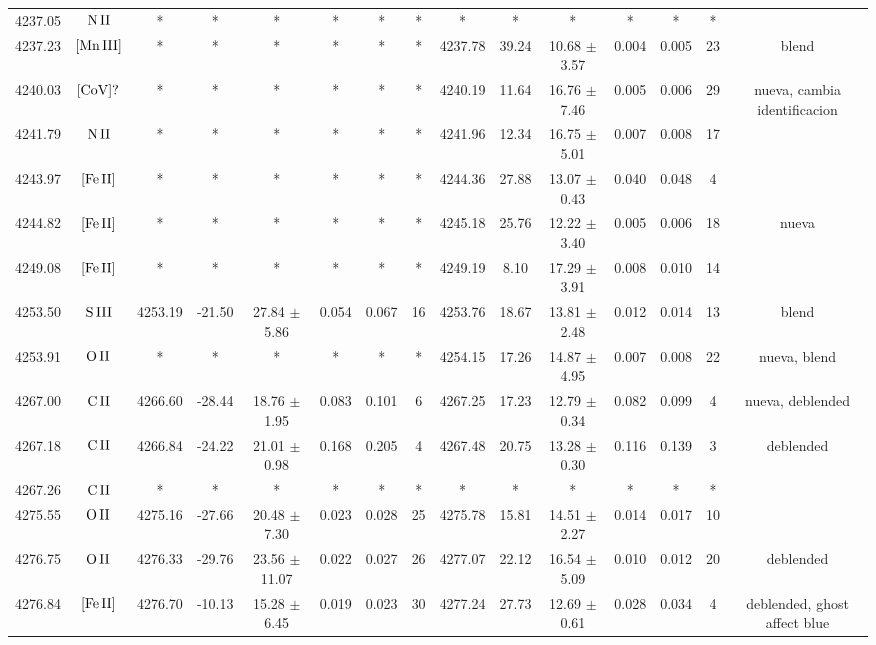 \documentclass{article}
\begin{document}
\begin{table*}
\begin{adjustbox}{width=\textwidth}
\begin{tabular}{ccccccccccccccc}
4237.05 & $\mbox{N}\thinspace \mbox{II}$ & * & * & * & * & * & * & * & * & * & * & * & * &  \\
4237.23 & $\mbox{[Mn}\thinspace \mbox{III]}$ & * & * & * & * & * & * & 4237.78 & 39.24 & 10.68 $\pm$ 3.57 & 0.004 & 0.005 & 23 &  blend \\
4240.03 & $\mbox{[CoV]?}\thinspace \mbox{}$ & * & * & * & * & * & * & 4240.19 & 11.64 & 16.76 $\pm$ 7.46 & 0.005 & 0.006 & 29 &  nueva, cambia identificacion \\
4241.79 & $\mbox{N}\thinspace \mbox{II}$ & * & * & * & * & * & * & 4241.96 & 12.34 & 16.75 $\pm$ 5.01 & 0.007 & 0.008 & 17 &  \\
4243.97 & $\mbox{[Fe}\thinspace \mbox{II]}$ & * & * & * & * & * & * & 4244.36 & 27.88 & 13.07 $\pm$ 0.43 & 0.040 & 0.048 & 4 &  \\
4244.82 & $\mbox{[Fe}\thinspace \mbox{II]}$ & * & * & * & * & * & * & 4245.18 & 25.76 & 12.22 $\pm$ 3.40 & 0.005 & 0.006 & 18 &  nueva \\
4249.08 & $\mbox{[Fe}\thinspace \mbox{II]}$ & * & * & * & * & * & * & 4249.19 & 8.10 & 17.29 $\pm$ 3.91 & 0.008 & 0.010 & 14 &  \\
4253.50 & $\mbox{S}\thinspace \mbox{III}$ & 4253.19 & -21.50 & 27.84 $\pm$ 5.86 & 0.054 & 0.067 & 16 & 4253.76 & 18.67 & 13.81 $\pm$ 2.48 & 0.012 & 0.014 & 13 &  blend \\
4253.91 & $\mbox{O}\thinspace \mbox{II}$ & * & * & * & * & * & * & 4254.15 & 17.26 & 14.87 $\pm$ 4.95 & 0.007 & 0.008 & 22 &  nueva, blend \\
4267.00 & $\mbox{C}\thinspace \mbox{II}$ & 4266.60 & -28.44 & 18.76 $\pm$ 1.95 & 0.083 & 0.101 & 6 & 4267.25 & 17.23 & 12.79 $\pm$ 0.34 & 0.082 & 0.099 & 4 &  nueva, deblended \\
4267.18 & $\mbox{C}\thinspace \mbox{II}$ & 4266.84 & -24.22 & 21.01 $\pm$ 0.98 & 0.168 & 0.205 & 4 & 4267.48 & 20.75 & 13.28 $\pm$ 0.30 & 0.116 & 0.139 & 3 &  deblended \\
4267.26 & $\mbox{C}\thinspace \mbox{II}$ & * & * & * & * & * & * & * & * & * & * & * & * &  \\
4275.55 & $\mbox{O}\thinspace \mbox{II}$ & 4275.16 & -27.66 & 20.48 $\pm$ 7.30 & 0.023 & 0.028 & 25 & 4275.78 & 15.81 & 14.51 $\pm$ 2.27 & 0.014 & 0.017 & 10 &  \\
4276.75 & $\mbox{O}\thinspace \mbox{II}$ & 4276.33 & -29.76 & 23.56 $\pm$ 11.07 & 0.022 & 0.027 & 26 & 4277.07 & 22.12 & 16.54 $\pm$ 5.09 & 0.010 & 0.012 & 20 &  deblended \\
4276.84 & $\mbox{[Fe}\thinspace \mbox{II]}$ & 4276.70 & -10.13 & 15.28 $\pm$ 6.45 & 0.019 & 0.023 & 30 & 4277.24 & 27.73 & 12.69 $\pm$ 0.61 & 0.028 & 0.034 & 4 &  deblended, ghost affect blue \\

\end{tabular}
\end{adjustbox}
\end{table*}
\end{document}
